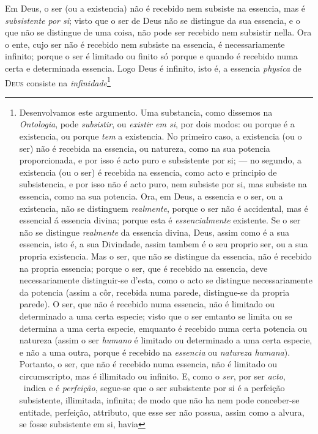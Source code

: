  Em Deus, o ser (ou a existencia) não é recebido nem subsiste na essencia, mas é
\emph{subsistente por si}; visto que o ser de Deus não se distingue da sua essencia, e o
que não se distingue de uma coisa, não pode ser recebido nem subsistir nella. Ora o ente,
cujo ser não é recebido nem subsiste na essencia, é necessariamente infinito; porque o ser
é limitado ou finito só porque e quando é recebido numa certa e determinada essencia. Logo
Deus é infinito, isto é, a essencia \emph{physica} de \textsc{Deus} consiste na
\emph{infinidade}\footnote{Desenvolvamos este argumento. Uma substancia, como dissemos na
\emph{Ontologia}, pode \emph{subsistir}, ou \emph{existir em si}, por dois modos: ou
porque é a existencia, ou porque \emph{tem} a existencia. No primeiro caso, a existencia
(ou o ser) não é recebida na essencia, ou natureza, como na sua potencia proporcionada, e
por isso é acto puro e subsistente por si; --- no segundo, a existencia (ou o ser) é
recebida na essencia, como acto e principio de subsistencia, e por isso não é acto puro,
nem subsiste por si, mas subsiste na essencia, como na sua potencia. Ora, em Deus, a
essencia e o ser, ou a existencia, não se distinguem \emph{realmente}, porque o ser não é
accidental, mas é essencial á essencia divina; porque esta é \emph{essencialmente}
existente. Se o ser não se distingue \emph{realmente} da essencia divina, Deus, assim como
é a sua essencia, isto é, a sua Divindade, assim tambem é o seu proprio ser, ou a sua
propria existencia. Mas o ser, que não se distingue da essencia, não é recebido na
propria essencia; porque o ser, que é recebido na essencia, deve necessariamente
distinguir-se d'esta, como o acto se distingue necessariamente da potencia (assim a côr,
recebida numa parede, distingue-se da propria parede). O ser, que não é recebido numa
essencia, não é limitado ou determinado a uma certa especie; visto que o ser emtanto se
limita ou se determina a uma certa especie, emquanto é recebido numa certa potencia ou
natureza (assim o ser \emph{humano} é limitado ou determinado a uma certa especie, e não a
uma outra, porque é recebido na \emph{essencia} ou \emph{natureza humana}). Portanto, o
ser, que não é recebido numa essencia, não é limitado ou circumscripto, mas é illimitado
ou infinito. E, como o \emph{ser}, por ser \emph{acto}, ~indica e é
\emph{perfeição}, segue-se que o ser subsistente por si é a perfeição subsistente,
illimitada, infinita; de modo que não ha nem pode conceber-se entitade, perfeição,
attributo, que esse ser não possua, assim como a alvura, se fosse subsistente em si, havia
}

